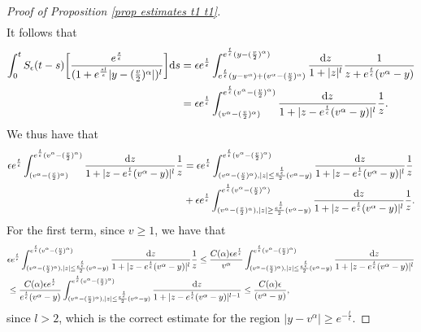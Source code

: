 \documentclass[11pt]{article}
\numberwithin{equation}{section}
\newcommand{\der}{\textup{d}}
\begin{document}
\begin{proof}[Proof of Proposition 
\ref{prop estimates t1 t1}]
\begin{align*}
  \end{align*}
  It follows that
  \begin{align*}
      \int_{0}^{t}S_{\epsilon}(t-s)\bigg[\frac{ e^{\frac{s}{\epsilon}}}{(1+e^{\frac{sl}{\epsilon}}|y-(\frac{v}{2})^{\alpha}|)^{l}}\bigg]\der s
      &=\epsilon e^{\frac{t}{\epsilon}} \int_{e^{\frac{t}{\epsilon}}(y-v^{\alpha})+(v^{\alpha}-(\frac{v}{2})^{\alpha})}^{e^{\frac{t}{\epsilon}}(y-(\frac{v}{2})^{\alpha})}\frac{\der z}{1+|z|^{l}}\frac{1}{z+e^{\frac{t}{\epsilon}}(v^{\alpha}-y)}\\
      &=\epsilon e^{\frac{t}{\epsilon}} \int_{(v^{\alpha}-(\frac{v}{2})^{\alpha})}^{e^{\frac{t}{\epsilon}}(v^{\alpha}-(\frac{v}{2})^{\alpha})}\frac{\der z}{1+|z-e^{\frac{t}{\epsilon}}(v^{\alpha}-y)|^{l}}\frac{1}{z}.
  \end{align*}
We thus have that
\begin{align*}
 \epsilon e^{\frac{t}{\epsilon}} \int_{(v^{\alpha}-(\frac{v}{2})^{\alpha})}^{e^{\frac{t}{\epsilon}}(v^{\alpha}-(\frac{v}{2})^{\alpha})}\frac{\der z}{1+|z-e^{\frac{t}{\epsilon}}(v^{\alpha}-y)|^{l}}\frac{1}{z}&=\epsilon e^{\frac{t}{\epsilon}} \int_{(v^{\alpha}-(\frac{v}{2})^{\alpha}), |z|\leq \frac{e^{\frac{t}{\epsilon}}}{2}(v^{\alpha}-y)}^{e^{\frac{t}{\epsilon}}(v^{\alpha}-(\frac{v}{2})^{\alpha})}\frac{\der z}{1+|z-e^{\frac{t}{\epsilon}}(v^{\alpha}-y)|^{l}}\frac{1}{z}\\
    &+\epsilon e^{\frac{t}{\epsilon}} \int_{(v^{\alpha}-(\frac{v}{2})^{\alpha}), |z|\geq \frac{e^{\frac{t}{\epsilon}}}{2}(v^{\alpha}-y)}^{e^{\frac{t}{\epsilon}}(v^{\alpha}-(\frac{v}{2})^{\alpha})}\frac{\der z}{1+|z-e^{\frac{t}{\epsilon}}(v^{\alpha}-y)|^{l}}\frac{1}{z}.
\end{align*}
For the first term, since $v\geq 1$, we have that
\begin{align*}
 & \epsilon e^{\frac{t}{\epsilon}} \int_{(v^{\alpha}-(\frac{v}{2})^{\alpha}), |z|\leq \frac{e^{\frac{t}{\epsilon}}}{2}(v^{\alpha}-y)}^{e^{\frac{t}{\epsilon}}(v^{\alpha}-(\frac{v}{2})^{\alpha})}\frac{\der z}{1+|z-e^{\frac{t}{\epsilon}}(v^{\alpha}-y)|^{l}}\frac{1}{z}\leq \frac{C(\alpha)\epsilon e^{\frac{t}{\epsilon}} }{v^{\alpha}}\int_{(v^{\alpha}-(\frac{v}{2})^{\alpha}), |z|\leq \frac{e^{\frac{t}{\epsilon}}}{2}(v^{\alpha}-y)}^{e^{\frac{t}{\epsilon}}(v^{\alpha}-(\frac{v}{2})^{\alpha})}\frac{\der z}{1+|z-e^{\frac{t}{\epsilon}}(v^{\alpha}-y)|^{l}}\\
    &\leq \frac{C(\alpha)\epsilon e^{\frac{t}{\epsilon}} }{ e^{\frac{t}{\epsilon}}(v^{\alpha}-y)}\int_{(v^{\alpha}-(\frac{v}{2})^{\alpha}), |z|\leq \frac{e^{\frac{t}{\epsilon}}}{2}(v^{\alpha}-y)}^{e^{\frac{t}{\epsilon}}(v^{\alpha}-(\frac{v}{2})^{\alpha})}\frac{\der z}{1+|z-e^{\frac{t}{\epsilon}}(v^{\alpha}-y)|^{l-1}}\leq  \frac{C(\alpha) \epsilon }{ (v^{\alpha}-y)},
\end{align*}
since $l>2$, which is the correct estimate for the region $|y-v^{\alpha}|\geq e^{-\frac{t}{\epsilon}}$. 


\end{proof}
\end{document}
